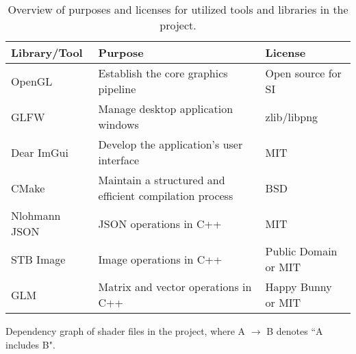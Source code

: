 
\vspace{\baselineskip}

\setlength{\arrayrulewidth}{0.2mm} %
\renewcommand{\arraystretch}{1.2} %

\begin{table}[h]
    \centering
    \begin{tabular}{|>{\raggedright\arraybackslash}p{3.5cm}|>{\raggedright\arraybackslash}p{7cm}|>{\raggedright\arraybackslash}p{4.5cm}|}
        \hline
        \textbf{Library/Tool} & \textbf{Purpose} & \textbf{License} \\
        \hline
        OpenGL & Establish the core graphics pipeline & Open source for SI \\
        GLFW & Manage desktop application windows & zlib/libpng \\
        Dear ImGui & Develop the application's user interface & MIT \\
        CMake & Maintain a structured and efficient compilation process & BSD \\
        Nlohmann JSON & JSON operations in C++ & MIT \\
        STB Image & Image operations in C++ & Public Domain or MIT \\
        GLM & Matrix and vector operations in C++ & Happy Bunny or MIT \\
        \hline
    \end{tabular}
    \caption{Overview of purposes and licenses for utilized tools and libraries in the project.}
    \label{tools_table}
\end{table}

\renewcommand{\arraystretch}{1.0} %

{Dependency graph of shader files in the project, where A $\rightarrow$ B denotes ``A includes B".}
